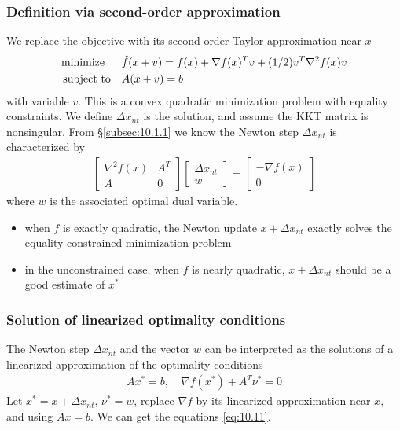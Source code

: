\subsubsection{Definition via second-order approximation}
We replace the objective with its second-order Taylor approximation near $x$
\begin{align}
  \text{minimize\;\;}\quad& \hat{f}(x+v)=f(x)+\nabla f(x)^Tv+(1/2)v^T\nabla^2f(x)v\label{eq:10.10}\\
  \text{subject to}  \quad& A(x+v)=b\nonumber
\end{align}
with variable $v$.
This is a convex quadratic minimization problem with equality constraints.
We define $\Delta x_{nt}$ is the solution, and assume the KKT matrix is nonsingular.
From \S\ref{subsec:10.1.1} we know the Newton step $\Delta x_{nt}$ is characterized by
\begin{align}
  \begin{bmatrix}
    \nabla^2f(x)&A^T\\A&0
  \end{bmatrix}
  \begin{bmatrix}
    \Delta x_{nt}\\w
  \end{bmatrix}=
  \begin{bmatrix}
    -\nabla f(x)\\0
  \end{bmatrix}\label{eq:10.11}
\end{align}
where $w$ is the associated optimal dual variable.
\begin{itemize}
  \item when $f$ is exactly quadratic, the Newton update $x+\Delta x_{nt}$ exactly solves the equality constrained minimization problem
  \item in the unconstrained case, when $f$ is nearly quadratic, $x+\Delta x_{nt}$ should be a good estimate of $x^\ast$
\end{itemize}

\subsubsection{Solution of linearized optimality conditions}
The Newton step $\Delta x_{nt}$ and the vector $w$ can be interpreted as the solutions of a linearized approximation of the optimality conditions
\begin{align*}
  Ax^\ast=b,\quad\nabla f(x^\ast)+A^T\nu^\ast=0
\end{align*}
Let $x^\ast=x+\Delta x_{nt}$, $\nu^\ast=w$, replace $\nabla f$ by its linearized approximation near $x$, and using $Ax=b$.
We can get the equations \eqref{eq:10.11}.

